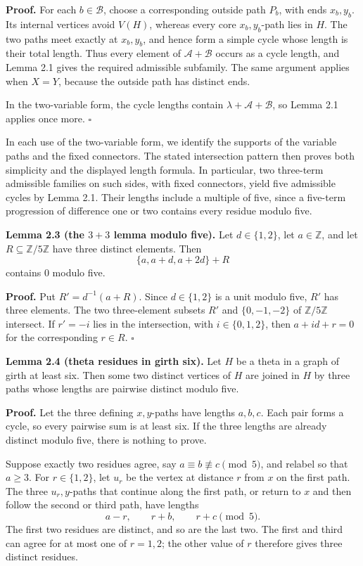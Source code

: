 \documentclass[
  11pt]{article}
\begin{document}

\textbf{Proof.} For each \(b\in\mathcal B\), choose a corresponding
outside path \(P_b\), with ends \(x_b,y_b\). Its internal vertices avoid
\(V(H)\), whereas every core \(x_b,y_b\)-path lies in \(H\). The two
paths meet exactly at \(x_b,y_b\), and hence form a simple cycle whose
length is their total length. Thus every element of
\(\mathcal A+\mathcal B\) occurs as a cycle length, and Lemma 2.1 gives
the required admissible subfamily. The same argument applies when
\(X=Y\), because the outside path has distinct ends.

In the two-variable form, the cycle lengths contain
\(\lambda+\mathcal A+\mathcal B\), so Lemma 2.1 applies once more.
\(\square\)

In each use of the two-variable form, we identify the supports of the
variable paths and the fixed connectors. The stated intersection pattern
then proves both simplicity and the displayed length formula. In
particular, two three-term admissible families on such sides, with fixed
connectors, yield five admissible cycles by Lemma 2.1. Their lengths
include a multiple of five, since a five-term progression of difference
one or two contains every residue modulo five.

\textbf{Lemma 2.3 (the \(3+3\) lemma modulo five).} Let \(d\in\{1,2\}\),
let \(a\in\mathbb Z\), and let \(R\subseteq\mathbb Z/5\mathbb Z\) have
three distinct elements. Then \[
 \{a,a+d,a+2d\}+R
\] contains \(0\) modulo five.

\textbf{Proof.} Put \(R'=d^{-1}(a+R)\). Since \(d\in\{1,2\}\) is a unit
modulo five, \(R'\) has three elements. The two three-element subsets
\(R'\) and \(\{0,-1,-2\}\) of \(\mathbb Z/5\mathbb Z\) intersect. If
\(r'=-i\) lies in the intersection, with \(i\in\{0,1,2\}\), then
\(a+id+r=0\) for the corresponding \(r\in R\). \(\square\)

\textbf{Lemma 2.4 (theta residues in girth six).} Let \(H\) be a theta
in a graph of girth at least six. Then some two distinct vertices of
\(H\) are joined in \(H\) by three paths whose lengths are pairwise
distinct modulo five.

\textbf{Proof.} Let the three defining \(x,y\)-paths have lengths
\(a,b,c\). Each pair forms a cycle, so every pairwise sum is at least
six. If the three lengths are already distinct modulo five, there is
nothing to prove.

Suppose exactly two residues agree, say \(a\equiv b\not\equiv c\pmod5\),
and relabel so that \(a\ge3\). For \(r\in\{1,2\}\), let \(u_r\) be the
vertex at distance \(r\) from \(x\) on the first path. The three
\(u_r,y\)-paths that continue along the first path, or return to \(x\)
and then follow the second or third path, have lengths \[
 a-r,\qquad r+b,\qquad r+c \pmod5.
\] The first two residues are distinct, and so are the last two. The
first and third can agree for at most one of \(r=1,2\); the other value
of \(r\) therefore gives three distinct residues.
\end{document}
